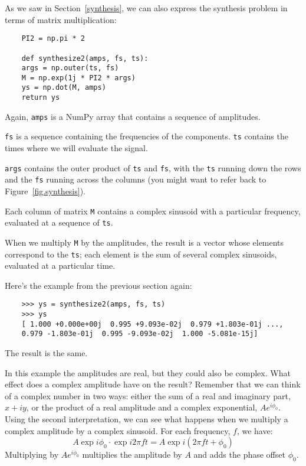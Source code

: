 As we saw in Section~\ref{synthesis}, we can also express the synthesis
problem in terms of matrix multiplication:

\begin{verbatim}
	PI2 = np.pi * 2
	
	def synthesize2(amps, fs, ts):
	args = np.outer(ts, fs)
	M = np.exp(1j * PI2 * args)
	ys = np.dot(M, amps)
	return ys
\end{verbatim}

Again, {\tt amps} is a NumPy array that contains a sequence of
amplitudes.

{\tt fs} is a sequence containing the frequencies of the
components.  {\tt ts} contains the times where we will evaluate
the signal.

{\tt args} contains the outer product of {\tt ts} and {\tt fs},
with the {\tt ts} running down the rows and the {\tt fs} running
across the columns (you might want to refer back to
Figure~\ref{fig.synthesis}).

Each column of matrix {\tt M} contains a complex sinusoid with
a particular frequency, evaluated at a sequence of {\tt ts}.

When we multiply {\tt M} by the amplitudes, the result is a vector
whose elements correspond to the {\tt ts}; each element is the sum of
several complex sinusoids, evaluated at a particular time.

Here's the example from the previous section again:

\begin{verbatim}
	>>> ys = synthesize2(amps, fs, ts)
	>>> ys
	[ 1.000 +0.000e+00j  0.995 +9.093e-02j  0.979 +1.803e-01j ...,
	0.979 -1.803e-01j  0.995 -9.093e-02j  1.000 -5.081e-15j]
\end{verbatim}

The result is the same.

In this example the amplitudes are real, but they could also be
complex.  What effect does a complex amplitude have on the result?
Remember that we can think of a complex number in two ways: either the
sum of a real and imaginary part, $x + i y$, or the product of a real
amplitude and a complex exponential, $A e^{i \phi_0}$.  Using the
second interpretation, we can see what happens when we multiply
a complex amplitude by a complex sinusoid.  For each frequency, $f$,
we have:
%
\[ A \exp{i \phi_0} \cdot \exp{i 2 \pi f t} = A \exp{i (2 \pi f t + \phi_0)} \]
%
Multiplying by $A e^{i \phi_0}$ multiplies the amplitude by $A$
and adds the phase offset $\phi_0$.

